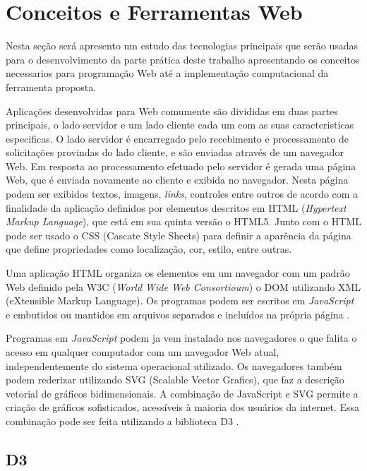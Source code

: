 \section{Conceitos e Ferramentas Web}

Nesta seção será apresento um estudo das tecnologias principais que serão usadas para o desenvolvimento da parte prática deste trabalho apresentando os conceitos necessarios para programação Web até a implementação computacional da ferramenta proposta.

Aplicações desenvolvidas para Web comumente são divididas em duas partes principais, o lado servidor e um lado cliente cada um com as suas caracteristicas especificas. O lado servidor é encarregado pelo recebimento e processamento de solicitações provindas do lado cliente, e são enviadas através de um navegador Web. 
Em resposta ao processamento efetuado pelo servidor é gerada uma página Web, que é enviada novamente ao cliente e exibida no navegador.  Nesta página podem ser exibidos textos, imagens, \textit{links}, controles entre outros de acordo com a finalidade da aplicação definidos por elementos descritos em HTML (\textit{Hypertext Markup Language}), que está em sua quinta versão o HTML5. Junto com o HTML pode ser usado o CSS (Cascate Style Sheets) para definir a aparência da página que define propriedades como localização, cor, estilo, entre outras\cite{pagliosa2016visualizaccao}.

Uma aplicação HTML organiza os elementos em um navegador com um padrão Web definido pela W3C (\textit{World Wide Web Consortioum}) o DOM utilizando XML (eXtensible Markup Language). Os programas podem ser escritos em \textit{JavaScript} e embutidos ou mantidos em arquivos separados e incluídos na própria página \cite{wang2013definitive} \cite{pagliosa2016visualizaccao}.

Programas em \textit{JavaScript} podem ja vem instalado nos navegadores o que falita o acesso em qualquer computador com um navegador Web atual, independentemente do sistema operacional utilizado. Os navegadores também podem rederizar utilizando SVG (Scalable Vector Grafics), que faz a descrição vetorial de gráficos bidimensionais. A combinação de JavaScript e SVG permite a criação de gráficos sofisticados, acessíveis à maioria dos usuários da internet. Essa combinação pode ser feita utilizando a biblioteca D3 \cite{pagliosa2016visualizaccao}.

	
\subsection{D3}

